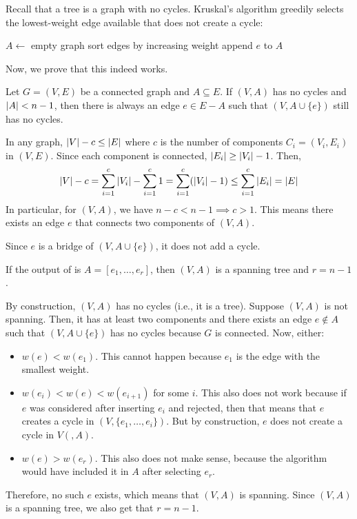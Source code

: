 Recall that a tree is a graph with no cycles.
Kruskal's algorithm greedily selects the lowest-weight edge available
that does not create a cycle:

\begin{algorithm}[H]
  \caption{\label{alg:g:mst1}}
  \begin{algorithmic}[1]
    \State $A \gets $ empty graph
    \State sort edges by increasing weight
    \State append $e$ to $A$
    \EndIf
    \EndFor
  \end{algorithmic}
\end{algorithm}

Now, we prove that this indeed works.

\begin{claim}
  Let $G = (V,E)$ be a connected graph and $A \subseteq E$.
  If $(V,A)$ has no cycles and $\abs{A} < n-1$,
  then there is always an edge $e \in E-A$ such that $(V,A \cup \{e\})$
  still has no cycles.
\end{claim}
\begin{prf}
  In any graph, $\abs{V} - c \leq \abs{E}$
  where $c$ is the number of components $C_i = (V_i,E_i)$ in $(V,E)$.
  Since each component is connected, $\abs{E_i} \geq \abs{V_i} - 1$. Then,
  \[
    \abs{V} - c
    = \sum_{i=1}^c \abs{V_i} - \sum_{i=1}^c 1
    = \sum_{i=1}^c (\abs{V_i} - 1)
    \leq \sum_{i=1}^c \abs{E_i} = \abs{E}
  \]
  In particular, for $(V,A)$, we have $n - c < n-1 \implies c > 1$.
  This means there exists an edge $e$ that connects two components of $(V,A)$.

  Since $e$ is a bridge of $(V, A\cup \{e\})$, it does not add a cycle.
\end{prf}

\begin{claim}\label{claim:g:2}
  If the output of  is $A = [e_1,\dotsc,e_r]$,
  then $(V,A)$ is a spanning tree and $r = n-1$.
\end{claim}
\begin{prf}
  By construction, $(V,A)$ has no cycles (i.e., it is a tree).
  Suppose $(V,A)$ is not spanning.
  Then, it has at least two components and there exists an edge $e \not\in A$
  such that $(V,A\cup\{e\})$ has no cycles because $G$ is connected.
  Now, either:
  \begin{itemize}
    \item $w(e) < w(e_1)$. This cannot happen because $e_1$ is the edge with the smallest weight.
    \item $w(e_i) < w(e) < w(e_{i+1})$ for some $i$.
          This also does not work because if $e$ was considered after inserting $e_i$
          and rejected, then that means that $e$ creates a cycle in $(V,\{e_1,\dotsc,e_i\})$.
          But by construction, $e$ does not create a cycle in $V(,A)$.
    \item $w(e) > w(e_r)$. This also does not make sense, because the algorithm
          would have included it in $A$ after selecting $e_r$.
  \end{itemize}
  Therefore, no such $e$ exists, which means that $(V,A)$ is spanning.
  Since $(V,A)$ is a spanning tree, we also get that $r = n-1$.
\end{prf}

